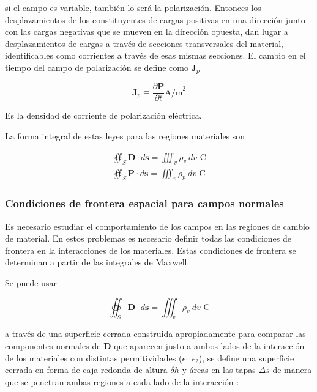 si el campo es variable, también lo será la polarización. Entonces los desplazamientos de los constituyentes de cargas positivas en una dirección junto con las cargas negativas que se mueven en la dirección opuesta, dan lugar a desplazamientos de cargas a través de secciones transversales del material, identificables como corrientes a través de esas mismas secciones. El cambio en el tiempo del campo de polarización se define como $\mathbf{J}_p$

\begin{equation*}
\mathbf{J}_p \equiv \frac{\partial \mathbf{P}}{\partial t} \text{A/m}^2
\end{equation*}

Es la densidad de corriente de polarización eléctrica.

La forma integral de estas leyes para las regiones materiales son 

\begin{eqnarray*}
\oiint_S \mathbf{D} \cdot d \mathbf{s} = \iiint_v \rho_v \ dv \text{ C} \\
\oiint_S \mathbf{P} \cdot d \mathbf{s} = \iiint_v \rho_p \ dv \text{ C} 
\end{eqnarray*}

\subsubsection{Condiciones de frontera espacial para campos normales}

Es necesario estudiar el comportamiento de los campos en las regiones de cambio de material. En estos problemas es necesario definir todas las condiciones de frontera en la interacciones de los materiales. Estas condiciones de frontera se determinan a partir de las integrales de Maxwell. 

Se puede usar 

\begin{equation*}
\oiint_S \mathbf{D} \cdot d \mathbf{s} = \iiint_v \rho_v \ dv \text{ C} 
\end{equation*}

a través de una superficie cerrada construida apropiadamente para comparar las componentes normales de $\mathbf{D}$ que aparecen justo a ambos lados de la interacción de los materiales con distintas permitividades ($\epsilon_1$ $\epsilon_2$), se define una superficie cerrada en forma de caja redonda de altura $\delta h$ y áreas en las tapas $\Delta s$ de manera que se penetran ambas regiones a cada lado de la interacción :

